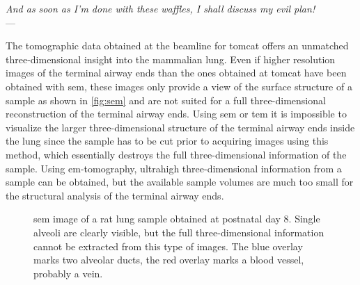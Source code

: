 \acresetall
{}\label{ch:discussion}
\begin{flushright}{\slshape And as soon as I'm done with these waffles, I shall discuss my evil plan!} \\ \medskip
	---  \citep{Zim}
\end{flushright}

\vfill

The tomographic data obtained at the beamline for \ac{tomcat} offers an unmatched three-dimensional insight into the mammalian lung. Even if higher resolution images of the terminal airway ends than the ones obtained at \ac{tomcat} have been obtained with \ac{sem}, these images only provide a view of the surface structure of a sample as shown in \autoref{fig:sem} and are not suited for a full three-dimensional reconstruction of the terminal airway ends. Using \ac{sem} or \ac{tem} it is impossible to visualize the larger three-dimensional structure of the terminal airway ends inside the lung since the sample has to be cut prior to acquiring images using this method, which essentially destroys the full three-dimensional information of the sample. Using \ac{em}-tomography, ultrahigh three-dimensional information from a sample can be obtained, but the available sample volumes  are much too small for the structural analysis of the terminal airway ends.

\begin{figure}
	\noindent{}%
	\caption[\acs{sem} image of a rat lung sample]{\ac{sem} image of a rat lung sample obtained at postnatal day 8. Single alveoli are clearly visible, but the full three-dimensional information cannot be extracted from this type of images. The blue overlay marks two alveolar ducts, the red overlay marks a blood vessel, probably a vein.}%
	\label{fig:sem}%
\end{figure}

